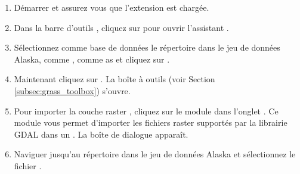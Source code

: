 \begin{enumerate}
  \item Démarrer \qg et assurez vous que l'extension \grass est chargée.
  \item Dans la barre d'outils \grass, cliquez sur  pour ouvrir l'assistant .
  \item Sélectionnez comme base de données \grass le répertoire  dans le jeu de données \qg Alaska, comme , comme as   et cliquez sur .
  \item Maintenant cliquez sur . La boîte à outils \grass (voir Section \ref{subsec:grass_toolbox}) s'ouvre.
  \item  Pour importer la couche raster , cliquez sur le module  dans l'onglet . Ce module \grass vous permet d'importer les fichiers raster supportés par la librairie GDAL dans un  \grass. La boîte de dialogue   apparaît.
  \item Naviguer jusqu'au répertoire  dans le jeu de données \qg Alaska et sélectionnez le fichier .

\end{enumerate}
